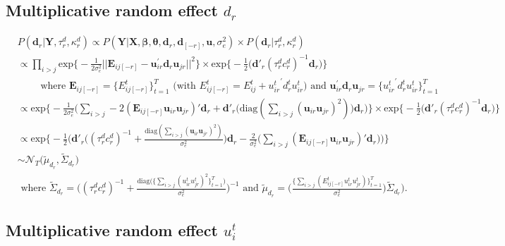 \documentclass[a4paper]{article}
\begin{document}
\subsection{Multiplicative random effect $d_r$}\label{d}
	\begin{equation}
	\begin{aligned}
	&P(\boldsymbol{d}_r|\mathbf{Y}, \tau_r^d, \kappa_r^d) \propto P(\mathbf{Y}|\mathbf{X}, \boldsymbol{\beta}, \boldsymbol{\theta}, \boldsymbol{d}_r, \boldsymbol{d}_{[-r]}, \boldsymbol{u},\sigma_e^2) \times P(\boldsymbol{d}_r| \tau_r^d, \kappa_r^d) \\
	&\propto\prod\limits_{i>j}\mbox{exp}\Big\{-\frac{1}{2\sigma_e^2}||\mathbf{E}_{ij[-r]}-\boldsymbol{u}_{ir}^\prime \boldsymbol{d}_r\boldsymbol{u}_{jr}||^2\Big\}\times \mbox{exp}\Big\{-\frac{1}{2}\big(\boldsymbol{d}'_r(\tau_r^dc_r^d)^{-1}\boldsymbol{d}_r\big)\Big\}\\ &\quad\quad\mbox{ where } \mathbf{E}_{ij[-r]} = \{E^t_{ij[-r]}\}_{t=1}^T \mbox{ (with }E^{t}_{ij[-r]}=E^t_{ij}+{u^t_{ir}}^\prime d_r^t u^t_{ir})\mbox{ and } \boldsymbol{u}_{ir}^\prime \boldsymbol{d}_r\boldsymbol{u}_{jr} = \{{u^t_{ir}}^\prime d_r^t u^t_{ir}\}_{t=1}^T\\
	&\propto\mbox{exp}\Big\{-\frac{1}{2\sigma_e^2}\Big(\sum\limits_{i>j}-2(\mathbf{E}_{ij[-r]}\boldsymbol{u}_{ir}\boldsymbol{u}_{jr})'\boldsymbol{d}_r+\boldsymbol{d}'_r\big(\mbox{diag}(\sum\limits_{i>j}({\boldsymbol{u}_{ir}\boldsymbol{u}_{jr}})^2)\big)\boldsymbol{d}_r\Big)\Big\}\times \mbox{exp}\Big\{-\frac{1}{2}\big(\boldsymbol{d}'_r(\tau_r^dc_r^d)^{-1}\boldsymbol{d}_r\big)\Big\}\\
	&\propto\mbox{exp}\Big\{-\frac{1}{2}\Big(\boldsymbol{d}'_r\big((\tau_r^dc_r^d)^{-1}+\frac{\mbox{diag}(\sum_{i>j}({\boldsymbol{u}_{ir}\boldsymbol{u}_{jr}})^2)}{\sigma_e^2}\big)\boldsymbol{d}_r-\frac{2}{\sigma_e^2}\big(\sum_{i>j}(\mathbf{E}_{ij[-r]}\boldsymbol{u}_{ir}\boldsymbol{u}_{jr})'\boldsymbol{d}_r\big)\Big)\Big\}\\
	& \sim \mathcal{N}_T\big(\tilde{\mu}_{d_r}, \tilde{\Sigma}_{d_r} \big)\\
	& \mbox{ where }\tilde{\Sigma}_{d_r} = \Big((\tau_r^d{c_r^d})^{-1}+\frac{\mbox{diag}\big(\{\sum_{i>j}({u^t_{ir}u^t_{jr}})^2\}_{t=1}^{T}\big)}{\sigma_e^2}\Big)^{-1} \mbox{ and } \tilde{\mu}_{d_r} =  \Big(\frac{\{\sum_{i>j}(E^{t}_{ij[-r]}u^t_{ir}u^t_{jr})\}_{t=1}^{T}}{\sigma_e^2}\Big)\tilde{\Sigma}_{d_r}).
	\end{aligned}
	\end{equation} 

\subsection{Multiplicative random effect $u^t_i$}\label{u}
\end{document}

